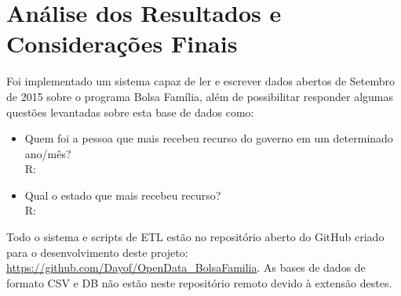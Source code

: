 \documentclass[12pt]{article}
\begin{document}
	\section{Análise dos Resultados e Considerações Finais}
	\label{sec:resultados}
	
	Foi implementado um sistema capaz de ler e escrever dados abertos de Setembro de 2015 sobre o programa Bolsa Família, além de possibilitar responder algumas questões levantadas sobre esta base de dados como:
	
	\begin{itemize}
		\item Quem foi a pessoa que mais recebeu  recurso do governo em um determinado ano/mês? \\
		R: 
		\item Qual o estado que mais recebeu recurso? \\
		R: 
	\end{itemize}
	
	Todo o sistema e scripts de ETL estão no repositório aberto do GitHub criado para o desenvolvimento deste projeto: \url{https://github.com/Dayof/OpenData_BolsaFamilia}. As bases de dados de formato CSV e DB não estão neste repositório remoto devido à extensão destes.
	

 

	
\end{document}
